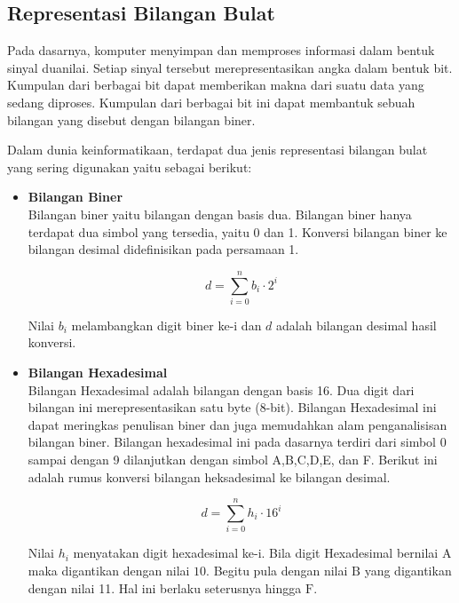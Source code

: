 \documentclass[10pt,conference]{IEEEtran}
\begin{document}
\subsection{Representasi Bilangan Bulat}
Pada dasarnya, komputer menyimpan dan memproses informasi dalam bentuk sinyal duanilai. Setiap sinyal tersebut merepresentasikan angka dalam bentuk bit. Kumpulan dari berbagai bit dapat memberikan makna dari suatu data  yang sedang diproses. Kumpulan dari berbagai bit ini dapat membantuk sebuah bilangan yang disebut dengan bilangan biner.

Dalam dunia keinformatikaan, terdapat dua jenis representasi bilangan bulat yang sering digunakan yaitu sebagai berikut:
\begin{itemize}
    \item \textbf{Bilangan Biner} \\
    Bilangan biner yaitu bilangan dengan basis dua. Bilangan biner hanya terdapat dua simbol yang tersedia, yaitu 0 dan 1. Konversi bilangan biner ke bilangan desimal didefinisikan pada persamaan 1.
    
    \begin{equation}
         d = \sum_{i=0}^{n} b_i \cdot 2^{i} 
    \end{equation}

    Nilai $ b_i $ melambangkan digit biner ke-i dan $ d $ adalah bilangan desimal hasil konversi. \\


    \item \textbf{Bilangan Hexadesimal} \\
    Bilangan Hexadesimal adalah bilangan dengan basis 16. Dua digit dari bilangan ini merepresentasikan satu byte (8-bit). Bilangan Hexadesimal ini dapat meringkas penulisan biner dan juga memudahkan alam penganalisisan bilangan biner. Bilangan hexadesimal ini pada dasarnya terdiri dari simbol 0 sampai dengan 9 dilanjutkan dengan simbol A,B,C,D,E, dan F. Berikut ini adalah rumus konversi bilangan heksadesimal ke bilangan desimal.

    \begin{equation}
        d = \sum_{i=0}^n h_i \cdot 16^{i}
    \end{equation}

    Nilai $ h_i $ menyatakan digit hexadesimal ke-i. Bila digit Hexadesimal bernilai $ \text{A} $ maka digantikan dengan nilai $ 10 $. Begitu pula dengan nilai $ \text{B} $ yang digantikan dengan nilai 11. Hal ini berlaku seterusnya hingga $ \text{F} $.
\end{itemize}
\end{document}
